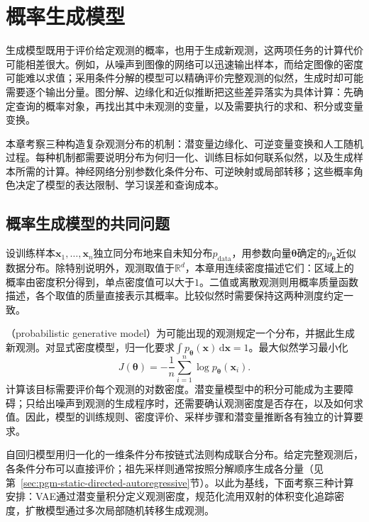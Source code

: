 \chapter{概率生成模型}
\label{chap:pgm-generative}

生成模型既用于评价给定观测的概率，也用于生成新观测，这两项任务的计算代价可能相差很大。例如，从噪声到图像的网络可以迅速输出样本，而给定图像的密度可能难以求值；采用条件分解的模型可以精确评价完整观测的似然，生成时却可能需要逐个输出分量。图分解、边缘化和近似推断把这些差异落实为具体计算：先确定查询的概率对象，再找出其中未观测的变量，以及需要执行的求和、积分或变量变换。

本章考察三种构造复杂观测分布的机制：潜变量边缘化、可逆变量变换和人工随机过程。每种机制都需要说明分布为何归一化、训练目标如何联系似然，以及生成样本所需的计算。神经网络分别参数化条件分布、可逆映射或局部转移；这些概率角色决定了模型的表达限制、学习误差和查询成本。

\section{概率生成模型的共同问题}
\label{sec:pgm-generative-common}

设训练样本$\bm{x}_1,\ldots,\bm{x}_n$独立同分布地来自未知分布$p_{\mathrm{data}}$，用参数向量$\bm{\theta}$确定的$p_{\bm{\theta}}$近似数据分布。除特别说明外，观测取值于$\mathbb{R}^{d}$，本章用连续密度描述它们：区域上的概率由密度积分得到，单点密度值可以大于$1$。二值或离散观测则用概率质量函数描述，各个取值的质量直接表示其概率。比较似然时需要保持这两种测度约定一致。

（probabilistic generative model）为可能出现的观测规定一个分布，并据此生成新观测。对显式密度模型，归一化要求$\int p_{\bm{\theta}}(\bm{x})\,\mathrm{d}\bm{x}=1$。最大似然学习最小化
\begin{equation}
  \label{eq:pgm-generative-nll}
  J(\bm{\theta})
  =-\frac{1}{n}\sum_{i=1}^{n}\log p_{\bm{\theta}}(\bm{x}_i).
\end{equation}
计算该目标需要评价每个观测的对数密度。潜变量模型中的积分可能成为主要障碍；只给出噪声到观测的生成程序时，还需要确认观测密度是否存在，以及如何求值。因此，模型的训练规则、密度评价、采样步骤和潜变量推断各有独立的计算要求。

自回归模型用归一化的一维条件分布按链式法则构成联合分布。给定完整观测后，各条件分布可以直接评价；祖先采样则通常按照分解顺序生成各分量（见第~\ref{sec:pgm-static-directed-autoregressive}节）。以此为基线，下面考察三种计算安排：VAE通过潜变量积分定义观测密度，规范化流用双射的体积变化追踪密度，扩散模型通过多次局部随机转移生成观测。

